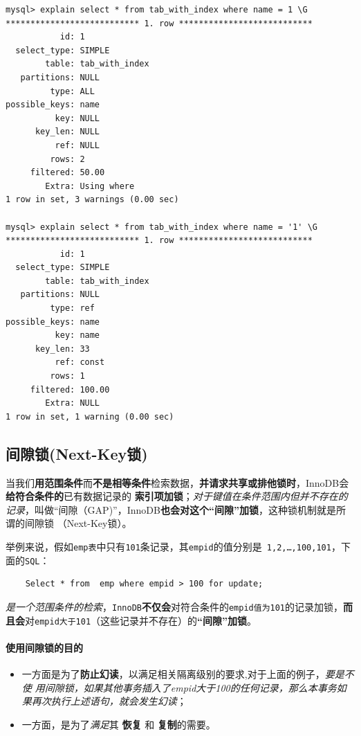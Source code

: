 \documentclass[UTF8,a4paper,12pt]{ctexbook}
\begin{document}
				\begin{lstlisting}	
mysql> explain select * from tab_with_index where name = 1 \G
*************************** 1. row ***************************
           id: 1
  select_type: SIMPLE
        table: tab_with_index
   partitions: NULL
         type: ALL
possible_keys: name
          key: NULL
      key_len: NULL
          ref: NULL
         rows: 2
     filtered: 50.00
        Extra: Using where
1 row in set, 3 warnings (0.00 sec)

mysql> explain select * from tab_with_index where name = '1' \G
*************************** 1. row ***************************
           id: 1
  select_type: SIMPLE
        table: tab_with_index
   partitions: NULL
         type: ref
possible_keys: name
          key: name
      key_len: 33
          ref: const
         rows: 1
     filtered: 100.00
        Extra: NULL
1 row in set, 1 warning (0.00 sec)	
				\end{lstlisting}
				
			
		\subsection{间隙锁(Next-Key锁)}
			当我们\textbf{用范围条件}而\textbf{不是相等条件}检索数据，\textbf{并请求共享或排他锁时}，InnoDB会\textbf{给符合条件的}已有数据记录的 \textbf{索引项加锁}；\textit{对于键值在条件范围内但并不存在的记录}，叫做“间隙（GAP)”，InnoDB\textbf{也会对这个“间隙”加锁}，这种锁机制就是所谓的间隙锁 （Next-Key锁）。
			
			
			举例来说，假如\verb|emp表|中只有\verb|101|条记录，其\verb|empid|的值分别是\verb| 1,2,…,100,101|，下面的\verb|SQL|：
			\begin{lstlisting}
	Select * from  emp where empid > 100 for update;		
			\end{lstlisting}
			
			\textit{是一个范围条件的检索}，\verb|InnoDB|\textbf{不仅会}对符合条件的\verb|empid值为101|的记录加锁，\textbf{而且会}对\verb|empid大于101|（这些记录并不存在）的\textbf{“间隙”加锁}。
			
			
			
			\paragraph{使用间隙锁的目的}
				
				\begin{itemize}
					\item 一方面是为了\textbf{防止幻读}，以满足相关隔离级别的要求,对于上面的例子，\textit{要是不使 用间隙锁，如果其他事务插入了empid大于100的任何记录，那么本事务如果再次执行上述语句，就会发生幻读}；
					\item 一方面，是为了\textit{满足}其 \textbf{恢复} 和 \textbf{复制}的需要。
				\end{itemize}
	
\end{document}
